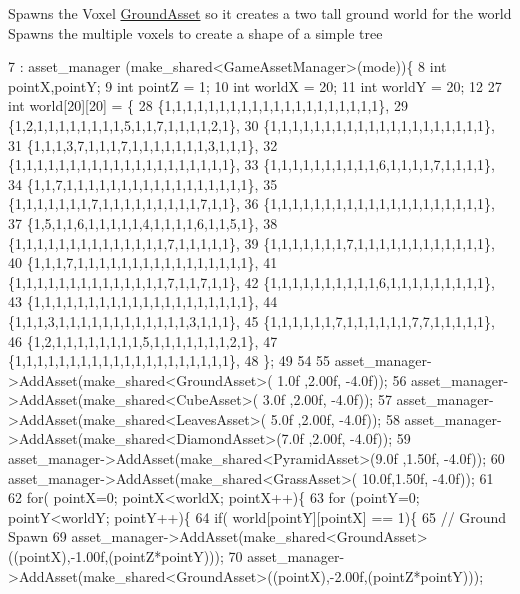 Spawns the Voxel \hyperlink{classGroundAsset}{Ground\+Asset} so it creates a two tall ground world for the world Spawns the multiple voxels to create a shape of a simple tree
\begin{DoxyCode}
7                                           : asset\_manager (make\_shared<GameAssetManager>(mode))\{
8   \textcolor{keywordtype}{int} pointX,pointY;
9   \textcolor{keywordtype}{int} pointZ = 1;
10   \textcolor{keywordtype}{int} worldX = 20;
11   \textcolor{keywordtype}{int} worldY = 20;
12 
27   \textcolor{keywordtype}{int} world[20][20] = \{
28   \{1,1,1,1,1,1,1,1,1,1,1,1,1,1,1,1,1,1,1,1\},
29   \{1,2,1,1,1,1,1,1,1,1,5,1,1,7,1,1,1,1,2,1\},
30   \{1,1,1,1,1,1,1,1,1,1,1,1,1,1,1,1,1,1,1,1\},
31   \{1,1,1,3,7,1,1,1,7,1,1,1,1,1,1,1,3,1,1,1\},
32   \{1,1,1,1,1,1,1,1,1,1,1,1,1,1,1,1,1,1,1,1\},
33   \{1,1,1,1,1,1,1,1,1,1,6,1,1,1,1,7,1,1,1,1\},
34   \{1,1,7,1,1,1,1,1,1,1,1,1,1,1,1,1,1,1,1,1\},
35   \{1,1,1,1,1,1,1,7,1,1,1,1,1,1,1,1,1,7,1,1\},
36   \{1,1,1,1,1,1,1,1,1,1,1,1,1,1,1,1,1,1,1,1\},
37   \{1,5,1,1,6,1,1,1,1,1,4,1,1,1,1,6,1,1,5,1\},
38   \{1,1,1,1,1,1,1,1,1,1,1,1,1,1,7,1,1,1,1,1\},
39   \{1,1,1,1,1,1,1,7,1,1,1,1,1,1,1,1,1,1,1,1\},
40   \{1,1,1,7,1,1,1,1,1,1,1,1,1,1,1,1,1,1,1,1\},
41   \{1,1,1,1,1,1,1,1,1,1,1,1,1,1,7,1,1,7,1,1\},
42   \{1,1,1,1,1,1,1,1,1,1,6,1,1,1,1,1,1,1,1,1\},
43   \{1,1,1,1,1,1,1,1,1,1,1,1,1,1,1,1,1,1,1,1\},
44   \{1,1,1,3,1,1,1,1,1,1,1,1,1,1,1,1,3,1,1,1\},
45   \{1,1,1,1,1,1,7,1,1,1,1,1,1,7,7,1,1,1,1,1\},
46   \{1,2,1,1,1,1,1,1,1,1,5,1,1,1,1,1,1,1,2,1\},
47   \{1,1,1,1,1,1,1,1,1,1,1,1,1,1,1,1,1,1,1,1\},
48   \};
49   
54 
55         asset\_manager->AddAsset(make\_shared<GroundAsset>( 1.0f ,2.00f, -4.0f));
56         asset\_manager->AddAsset(make\_shared<CubeAsset>(   3.0f ,2.00f, -4.0f));
57         asset\_manager->AddAsset(make\_shared<LeavesAsset>( 5.0f ,2.00f, -4.0f));
58         asset\_manager->AddAsset(make\_shared<DiamondAsset>(7.0f ,2.00f, -4.0f));
59         asset\_manager->AddAsset(make\_shared<PyramidAsset>(9.0f ,1.50f, -4.0f)); 
60         asset\_manager->AddAsset(make\_shared<GrassAsset>(  10.0f,1.50f, -4.0f));
61 
62   \textcolor{keywordflow}{for}( pointX=0; pointX<worldX; pointX++)\{
63    \textcolor{keywordflow}{for} (pointY=0; pointY<worldY; pointY++)\{
64     \textcolor{keywordflow}{if}( world[pointY][pointX] == 1)\{
65             \textcolor{comment}{// Ground Spawn           }
69 \textcolor{comment}{}            asset\_manager->AddAsset(make\_shared<GroundAsset>((pointX),-1.00f,(pointZ*pointY)));
70             asset\_manager->AddAsset(make\_shared<GroundAsset>((pointX),-2.00f,(pointZ*pointY)));

\end{DoxyCode}
